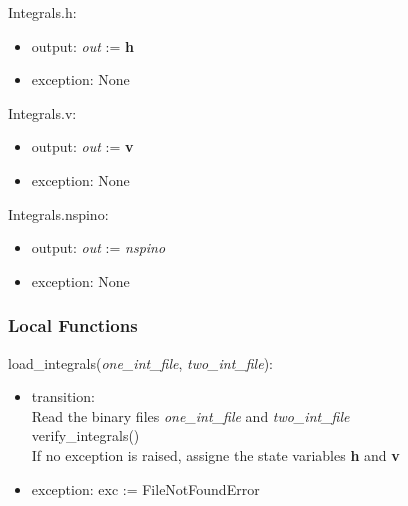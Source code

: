 \documentclass[12pt, titlepage]{article}
\begin{document}
\noindent Integrals.h:
\begin{itemize}
	\item output: \textit{out} := \textbf{h} 
	\item exception: None 
\end{itemize}

\noindent Integrals.v:
\begin{itemize}
	\item output: \textit{out} := \textbf{v} 
	\item exception: None 
\end{itemize}

\noindent Integrals.nspino:
\begin{itemize}
	\item output: \textit{out} := \textit{nspino} 
	\item exception: None 
\end{itemize}

%

\subsubsection{Local Functions}

\noindent load\_integrals(\textit{one\_int\_file}, \textit{two\_int\_file}):
\begin{itemize}
	\item transition: \\
	Read the binary files \textit{one\_int\_file} and 
	\textit{two\_int\_file} \\
	verify\_integrals()\\
	If no exception is raised, assigne the state variables \textbf{h} and 
	\textbf{v}	
	\item exception: exc := FileNotFoundError
\end{itemize}
\end{document}
